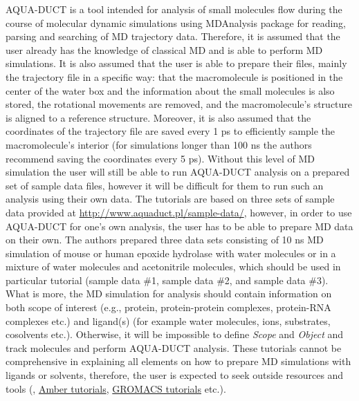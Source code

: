\documentclass[9pt,tutorial]{livecoms}
\begin{document}
AQUA-DUCT is a tool intended for analysis of small molecules flow during the course of molecular dynamic simulations using MDAnalysis \cite{Michaud-Agrawal2011} package for reading, parsing and searching of MD trajectory data. Therefore, it is
assumed that the user already has the knowledge of classical MD and is able to perform MD simulations. It is also assumed that the user is able to prepare their files, mainly the trajectory file in a specific way: that the macromolecule is positioned in the center of the water box and the information about the small molecules is also stored, the rotational movements are removed, and the macromolecule's structure is aligned to a reference structure. Moreover, it is also assumed that the coordinates of the trajectory file are saved every 1 ps to efficiently sample the macromolecule's interior (for simulations longer than 100 ns the authors recommend saving the coordinates every 5 ps). Without this level of MD simulation the user will still be able to run AQUA-DUCT analysis on a prepared set of sample data files, however it will be difficult for them to run such an analysis using their own data.
The tutorials are based on three sets of sample data provided at  \url{http://www.aquaduct.pl/sample-data/}, however, in order to use  AQUA-DUCT for one’s own analysis, the user has to be able to prepare MD data on their own. The authors prepared three data sets consisting of 10 ns MD simulation of mouse or human epoxide hydrolase with water molecules or in a mixture of water molecules and acetonitrile molecules, which should be used in particular tutorial (sample data \#1, sample data \#2, and sample data \#3). What is more, the MD simulation for analysis should contain information on both scope of interest (e.g., protein, protein-protein complexes, protein-RNA complexes etc.) and ligand(s) (for example water molecules, ions, substrates, cosolvents etc.). Otherwise, it will be impossible to define \textit{Scope} and \textit{Object} and track molecules and perform AQUA-DUCT analysis. These tutorials cannot be comprehensive in explaining all elements on how to prepare MD simulations with ligands or solvents, therefore, the user is expected to seek outside resources and tools (\cite{Mitusinska2020}, \href{https://ambermd.org/tutorials/}{Amber tutorials}, \href{http://www.mdtutorials.com/gmx/}{GROMACS tutorials} etc.). 
\end{document}
